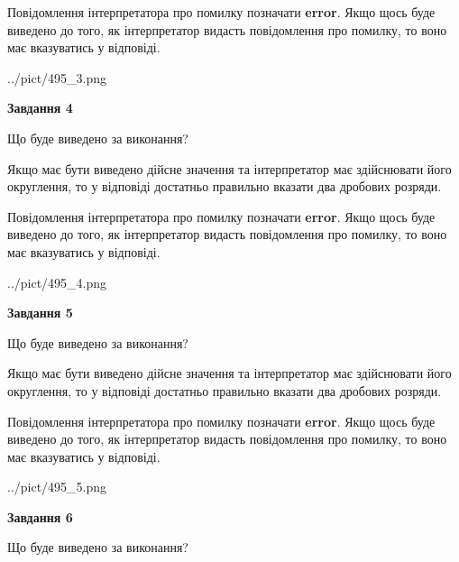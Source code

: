 \documentclass[12pt, ukrainian]{article}
\begin{document}
{\begin {Large}
Повідомлення інтерпретатора про помилку позначати \textbf{error}.
Якщо щось буде виведено до того, як інтерпретатор видасть повідомлення про помилку, 
то воно має вказуватись у відповіді. \par

\begin{center}
	{../pict/495_3.png}
\end{center}
\newpage

{\begin {center}\textbf{Завдання 4}\end {center}}\par
Що буде виведено за виконання? \par

Якщо має бути виведено дійсне значення та інтерпретатор має здійснювати його округлення, 
то у відповіді достатньо правильно вказати два дробових розряди.

Повідомлення інтерпретатора про помилку позначати \textbf{error}.
Якщо щось буде виведено до того, як інтерпретатор видасть повідомлення про помилку, 
то воно має вказуватись у відповіді. \par

\begin{center}
	{../pict/495_4.png}
\end{center}
\newpage

{\begin {center}\textbf{Завдання 5}\end {center}}\par
Що буде виведено за виконання? \par

Якщо має бути виведено дійсне значення та інтерпретатор має здійснювати його округлення, 
то у відповіді достатньо правильно вказати два дробових розряди.

Повідомлення інтерпретатора про помилку позначати \textbf{error}.
Якщо щось буде виведено до того, як інтерпретатор видасть повідомлення про помилку, 
то воно має вказуватись у відповіді. \par

\begin{center}
	{../pict/495_5.png}
\end{center}
\newpage

{\begin {center}\textbf{Завдання 6}\end {center}}\par
Що буде виведено за виконання? \par


\end{Large}}
\end{document}

